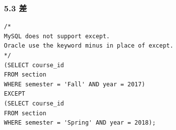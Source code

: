 \documentclass[aspectratio=169, 14pt]{beamer}
\begin{document}
\begin{frame}[fragile]
	\frametitle{5.3 差}

	\begin{verbatim}
/*
MySQL does not support except.
Oracle use the keyword minus in place of except.
*/
(SELECT course_id
FROM section
WHERE semester = 'Fall' AND year = 2017)
EXCEPT
(SELECT course_id
FROM section
WHERE semester = 'Spring' AND year = 2018);
    \end{verbatim}

\end{frame}









\end{document}
